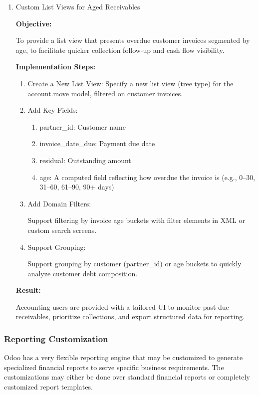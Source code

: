 \documentclass[11pt,a4paper]{article}
\begin{document}
\begin{enumerate}
    \item Custom List Views for Aged Receivables
    
    \textbf{Objective:}

    To provide a list view that presents overdue customer invoices segmented by age, to facilitate quicker collection follow-up and cash flow visibility.
    \medskip

    \textbf{Implementation Steps:}
    \begin{enumerate}
        \item Create a New List View: Specify a new list view (tree type) for the account.move model, filtered on customer invoices.
        \item Add Key Fields:
        \begin{enumerate}
            \item partner\_id: Customer name
            \item invoice\_date\_due: Payment due date
            \item residual: Outstanding amount
            \item age: A computed field reflecting how overdue the invoice is (e.g., 0–30, 31–60, 61–90, 90+ days)
        \end{enumerate}
        \item Add Domain Filters:
        
        Support filtering by invoice age buckets with filter elements in XML or custom search screens.
        \item Support Grouping:
        
        Support grouping by customer (partner\_id) or age buckets to quickly analyze customer debt composition.
    \end{enumerate}

    \textbf{Result:}

    Accounting users are provided with a tailored UI to monitor past-due receivables, prioritize collections, and export structured data for reporting.

\end{enumerate}

\subsubsection{Reporting Customization}
Odoo has a very flexible reporting engine that may be customized to generate specialized financial reports to serve specific business requirements. The customizations may either be done over standard financial reports or completely customized report templates.
\end{document}
